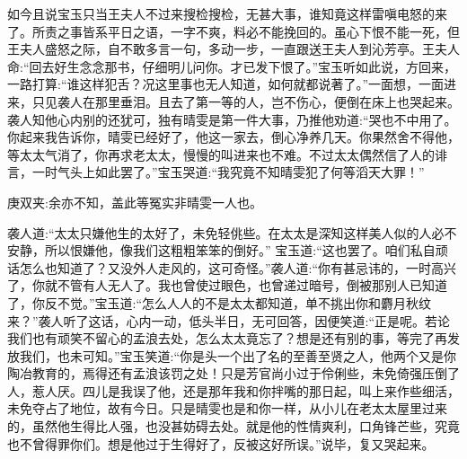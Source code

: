 \begin{parag}
    如今且说宝玉只当王夫人不过来搜检搜检，无甚大事，谁知竟这样雷嗔电怒的来了。所责之事皆系平日之语，一字不爽，料必不能挽回的。虽心下恨不能一死，但王夫人盛怒之际，自不敢多言一句，多动一步，一直跟送王夫人到沁芳亭。王夫人命:“回去好生念念那书，仔细明儿问你。才已发下恨了。”宝玉听如此说，方回来，一路打算:“谁这样犯舌？况这里事也无人知道，如何就都说著了。”一面想，一面进来，只见袭人在那里垂泪。且去了第一等的人，岂不伤心，便倒在床上也哭起来。袭人知他心内别的还犹可，独有晴雯是第一件大事，乃推他劝道:“哭也不中用了。你起来我告诉你，晴雯已经好了，他这一家去，倒心净养几天。你果然舍不得他，等太太气消了，你再求老太太，慢慢的叫进来也不难。不过太太偶然信了人的诽言，一时气头上如此罢了。”宝玉哭道:“我究竟不知晴雯犯了何等滔天大罪！”\begin{note}庚双夹:余亦不知，盖此等冤实非晴雯一人也。\end{note}袭人道:“太太只嫌他生的太好了，未免轻佻些。在太太是深知这样美人似的人必不安静，所以恨嫌他，像我们这粗粗笨笨的倒好。” 宝玉道:“这也罢了。咱们私自顽话怎么也知道了？又没外人走风的，这可奇怪。”袭人道:“你有甚忌讳的，一时高兴了，你就不管有人无人了。我也曾使过眼色，也曾递过暗号，倒被那别人已知道了，你反不觉。”宝玉道:“怎么人人的不是太太都知道，单不挑出你和麝月秋纹来？”袭人听了这话，心内一动，低头半日，无可回答，因便笑道:“正是呢。若论我们也有顽笑不留心的孟浪去处，怎么太太竟忘了？想是还有别的事，等完了再发放我们，也未可知。”宝玉笑道:“你是头一个出了名的至善至贤之人，他两个又是你陶冶教育的，焉得还有孟浪该罚之处！只是芳官尚小过于伶俐些，未免倚强压倒了人，惹人厌。四儿是我误了他，还是那年我和你拌嘴的那日起，叫上来作些细活，未免夺占了地位，故有今日。只是晴雯也是和你一样，从小儿在老太太屋里过来的，虽然他生得比人强，也没甚妨碍去处。就是他的性情爽利，口角锋芒些，究竟也不曾得罪你们。想是他过于生得好了，反被这好所误。”说毕，复又哭起来。
\end{parag}



